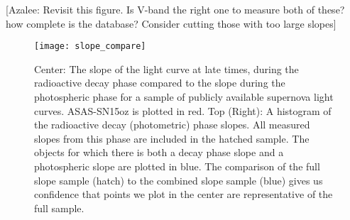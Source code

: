 \documentclass[preprint]{aastex61}
\newcommand{\azaleecomment}[1]{{\color{red} [{#1}]}}
\newcommand{\Azalee}[1]{\azaleecomment{Azalee: #1}}
\begin{document}
\Azalee{Revisit this figure. Is V-band the right one to measure both of these? how complete is the database? Consider cutting those with too large slopes}
\begin{figure}[h!] 
\begin{center}
\texttt{[image: slope\_compare]} %
\caption{Center: The slope of the light curve at late times, during the radioactive decay phase compared to the slope during the photospheric phase for a sample of publicly available supernova light curves.
ASAS-SN15oz is plotted in red.
Top (Right): A histogram of the radioactive decay (photometric) phase slopes. All measured slopes from this phase are included in the hatched sample.
The objects for which there is both a decay phase slope and a photospheric slope are plotted in blue. The comparison of the full slope sample (hatch) to the combined slope sample (blue) gives us confidence that points we plot in the center are representative of the full sample.}
\label{fig:SlopeComp}
\end{center}
\end{figure}


\clearpage
\end{document}
